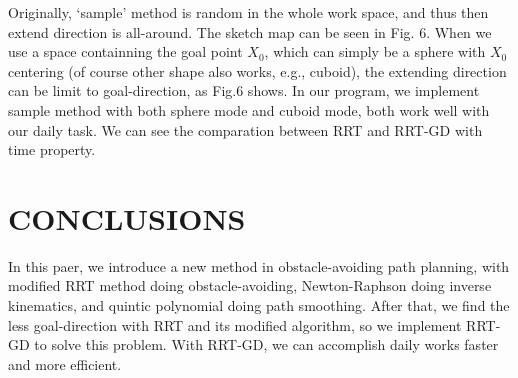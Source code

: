 \documentclass[letterpaper, 10 pt, conference]{ieeeconf}  %
\begin{document}
Originally, `sample' method is random in the whole work space, and thus then extend direction is all-around. The sketch map can be seen in Fig. 6. When we use a space containning the goal point $X_{0}$, which can simply be a sphere with $X_{0}$ centering (of course other shape also works, e.g., cuboid), the extending direction can be limit to goal-direction, as Fig.6 shows. In our program, we implement sample method with both sphere mode and cuboid mode, both work well with our daily task. We can see the comparation between RRT and RRT-GD with time property.

\section{CONCLUSIONS}

In this paer, we introduce a new method in obstacle-avoiding path planning, with modified RRT method doing obstacle-avoiding, Newton-Raphson doing inverse kinematics, and quintic polynomial doing path smoothing. After that, we find the less goal-direction with RRT and its modified algorithm, so we implement RRT-GD to solve this problem. With RRT-GD, we can accomplish daily works faster and more efficient.

\addtolength{\textheight}{-12cm}   %










\end{document}
